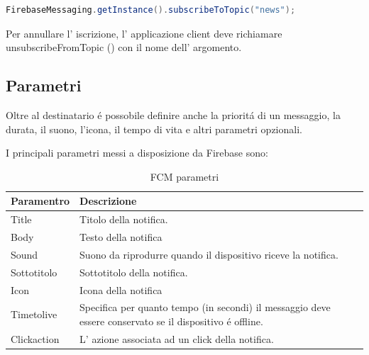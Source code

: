 \begin{lstlisting}[language=java,caption={FCM topic}]
 FirebaseMessaging.getInstance().subscribeToTopic("news");
\end{lstlisting}

Per annullare l' iscrizione, l' applicazione client deve richiamare unsubscribeFromTopic () con il nome dell' argomento.





\subsection{Parametri}

Oltre al destinatario \'e possobile definire anche la priorit\'a di un messaggio, la durata, il suono, l'icona, il tempo di vita e altri parametri opzionali.

I principali parametri messi a disposizione da Firebase sono:

\begin{table}[h]
\begin{center}
\begin{tabular}{|p{3cm}|p{11cm}|}
\hline
\textbf{Paramentro} & \textbf{Descrizione} \\ \hline
Title &	Titolo della notifica. \\   \hline
Body &	Testo della notifica \\   \hline
Sound  &	Suono da riprodurre quando il dispositivo riceve la notifica. \\   \hline
Sottotitolo  &	Sottotitolo della notifica. \\   \hline
Icon & Icona della notifica \\   \hline
Timetolive & Specifica per quanto tempo (in secondi) il messaggio deve essere conservato se il dispositivo \'e offline.  \\   \hline
Clickaction &	L' azione associata ad un click  della notifica. \\   \hline

\end{tabular}
\caption[Cloud Messaging paramentri ]{FCM parametri}\label{tab:FCFM parametri}
\end{center}
\end{table}


